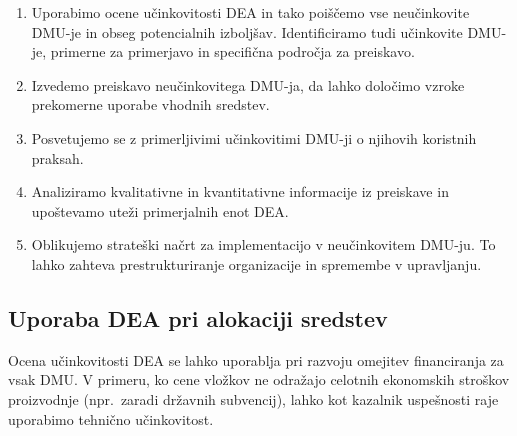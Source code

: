 \documentclass[12pt,a4paper]{article}
\theoremstyle{definition}
\begin{document}
\begin{enumerate}
    \item Uporabimo ocene učinkovitosti DEA in tako poiščemo
    vse neučinkovite DMU-je in obseg potencialnih izboljšav. 
    Identificiramo tudi učinkovite DMU-je, primerne za 
    primerjavo in specifična področja za preiskavo.
    
    \item Izvedemo preiskavo neučinkovitega 
    DMU-ja, da lahko določimo vzroke prekomerne 
    uporabe vhodnih sredstev.
    
    \item Posvetujemo se z primerljivimi učinkovitimi DMU-ji
    o njihovih koristnih praksah.
    
    \item Analiziramo kvalitativne in kvantitativne informacije
    iz preiskave in upoštevamo uteži primerjalnih enot DEA.
    
    \item Oblikujemo strateški načrt za implementacijo v 
    neučinkovitem DMU-ju. To lahko zahteva prestrukturiranje 
    organizacije in spremembe v upravljanju. \cite{Yaisawarng2002}
\end{enumerate}

\subsection{Uporaba DEA pri alokaciji sredstev}

Ocena učinkovitosti DEA se lahko uporablja pri razvoju
omejitev financiranja za vsak DMU. V primeru, ko cene
vložkov ne odražajo celotnih ekonomskih stroškov proizvodnje
(npr.\ zaradi državnih subvencij), lahko kot kazalnik 
uspešnosti raje uporabimo tehnično učinkovitost. 
\cite{Yaisawarng2002}
\end{document}
